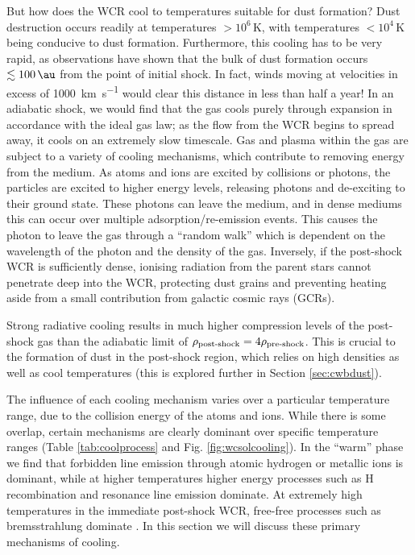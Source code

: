 But how does the WCR cool to temperatures suitable for dust formation?
Dust destruction occurs readily at temperatures $>10^6\, \si{\kelvin}$, with temperatures $<10^4\,\si{\kelvin}$ being conducive to dust formation.
Furthermore, this cooling has to be very rapid, as observations have shown that the bulk of dust formation occurs $\lesssim \SI{100}{\au}$ from the point of initial shock.
In fact, winds moving at velocities in excess of \SI{1000}{\kilo\metre\per\second} would clear this distance in less than half a year!
In an adiabatic shock, we would find that the gas cools purely through expansion in accordance with the ideal gas law; as the flow from the WCR begins to spread away, it cools on an extremely slow timescale.
Gas and plasma within the gas are subject to a variety of cooling mechanisms, which contribute to removing energy from the medium.
As atoms and ions are excited by collisions or photons, the particles are excited to higher energy levels, releasing photons and de-exciting to their ground state.
These photons can leave the medium, and in dense mediums this can occur over multiple adsorption/re-emission events.
This causes the photon to leave the gas through a ``random walk'' which is dependent on the wavelength of the photon and the density of the gas.
Inversely, if the post-shock WCR is sufficiently dense, ionising radiation from the parent stars cannot penetrate deep into the WCR, protecting dust grains and preventing heating aside from a small contribution from galactic cosmic rays (GCRs).

Strong radiative cooling results in much higher compression levels of the post-shock gas than the adiabatic limit of $\rho_\text{post-shock} = 4\rho_\text{pre-shock}$.
This is crucial to the formation of dust in the post-shock region, which relies on high densities as well as cool temperatures (this is explored further in Section \ref{sec:cwbdust}).

The influence of each cooling mechanism varies over a particular temperature range, due to the collision energy of the atoms and ions.
While there is some overlap, certain mechanisms are clearly dominant over specific temperature ranges (Table \ref{tab:coolprocess} and Fig. \ref{fig:wcsolcooling}).
In the ``warm'' phase we find that forbidden line emission through atomic hydrogen or metallic ions is dominant, while at higher temperatures higher energy processes such as H recombination and resonance line emission dominate.
At extremely high temperatures in the immediate post-shock WCR, free-free processes such as bremsstrahlung dominate
\parencite[Ch.~6]{dysonPhysicsInterstellarMedium2021}.
In this section we will discuss these primary mechanisms of cooling.


